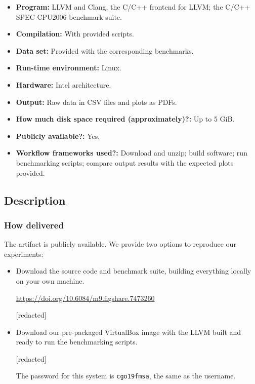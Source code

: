 {\small
\begin{itemize}
  \item {\bf Program: } LLVM and Clang, the C/C++ frontend for LLVM; the C/C++ SPEC CPU2006 benchmark suite.
  \item {\bf Compilation: } With provided scripts.
  \item {\bf Data set: } Provided with the corresponding benchmarks.
  \item {\bf Run-time environment: } Linux.
  \item {\bf Hardware: } Intel architecture.
  \item {\bf Output: } Raw data in CSV files and plots as PDFs.
  \item {\bf How much disk space required (approximately)?: } Up to 5 GiB.
  \item {\bf Publicly available?: } Yes.
  \item {\bf Workflow frameworks used?: } Download and unzip; build software; run benchmarking scripts; compare output results with the expected plots provided.
\end{itemize}

\subsection{Description}

\subsubsection{How delivered}

The artifact is publicly available.
We provide two options to reproduce our experiments:

\begin{itemize}
  \item Download the source code and benchmark suite, building everything locally on your own machine.

\url{https://doi.org/10.6084/m9.figshare.7473260}

[redacted]

  \item Download our pre-packaged VirtualBox image with the LLVM built and ready
to run the benchmarking scripts.

[redacted]

The password for this system is \texttt{cgo19fmsa}, the same as the username.


\end{itemize}}
